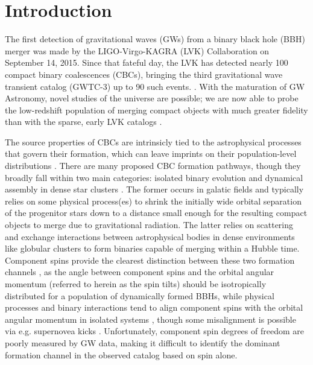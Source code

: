 \section{Introduction} \label{sec:intro}

The first detection of gravitational waves (GWs) from a binary black hole (BBH) merger was made by the LIGO-Virgo-KAGRA (LVK) Collaboration on September 14, 2015. Since that fateful day, the LVK has detected nearly 100 compact binary coalescences (CBCs), bringing the third gravitational wave transient catalog (GWTC-3) up to 90 such events. \citep{2015CQGra..32g4001L,2015CQGra..32b4001A, 2016PhRvL.116f1102A,2019PhRvX...9c1040A,2021PhRvX..11b1053A,2021arXiv211103606T, 2021PTEP.2021eA102A}. With the maturation of GW Astronomy, novel studies of the universe are possible; we are now able to probe the low-redshift population of merging compact objects with much greater fidelity than with the sparse, early LVK catalogs \citep{2019ApJ...882L..24A,2021ApJ...913L...7A,2023PhRvX..13a1048A}. 

The source properties of CBCs are intrinsicly tied to the astrophysical processes that govern their formation, which can leave imprints on their population-level distributions \citep{10.3847/1538-4357/ab88b2, 1806.05820}. There are many proposed CBC formation pathways, though they broadly fall within two main categories: isolated binary evolution \citep{10.1017/S0074180900011839, 10.1086/340304, 1403.4754, 1701.02355} and dynamical assembly in dense star clusters \citep{10.1038/364423a0, 2000ApJ...528L..17P, 2013LRR....16....4B}. The former occurs in galatic fields and typically relies on some physical process(es) to shrink the initially wide orbital separation of the progenitor stars down to a distance small enough for the resulting compact objects to merge due to gravitational radiation. The latter relies on scattering and exchange interactions between astrophysical bodies in dense environments like globular clusters to form binaries capable of merging within a Hubble time. Component spins provide the clearest distinction between these two formation channels \citep{10.1088/1361-6382/aa552e, 10.1093/mnras/stx1764, 1609.05916, 2017Natur.548..426F,2018ApJ...854L...9F}, as the angle between component spins and the orbital angular momentum (referred to herein as the spin tilts) should be isotropically distributed for a population of dynamically formed BBHs, while physical processes and binary interactions tend to align component spins with the orbital angular momentum in isolated systems \citep{1981A&A....99..126H, 2005MNRAS.363...49K, 2013A&ARv..21...59I}, though some misalignment is possible via e.g. supernovea kicks \citep{10.1093/mnras/274.2.461}. Unfortunately, component spin degrees of freedom are poorly measured by GW data, making it difficult to identify the dominant formation channel in the observed catalog based on spin alone. 

